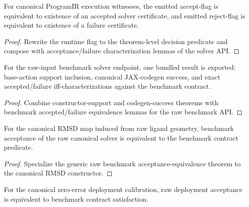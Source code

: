 \begin{theorem}\label{thm:canonical-program-execution-refines-solver-result}
For canonical ProgramIR execution witnesses, the emitted accept-flag is equivalent to existence of an accepted solver certificate, and emitted reject-flag is equivalent to existence of a failure certificate.
\end{theorem}

\begin{proof}
Rewrite the runtime flag to the theorem-level decision predicate and compose with acceptance/failure characterization lemmas of the solver API.
\end{proof}

\begin{theorem}\label{thm:raw-pocket-ligand-benchmark-solver-bundle}
For the raw-input benchmark solver endpoint, one bundled result is exported: base-action support inclusion, canonical JAX-codegen success, and exact accepted/failure iff-characterizations against the benchmark contract.
\end{theorem}

\begin{proof}
Combine constructor-support and codegen-success theorems with benchmark accepted/failure equivalence lemmas for the raw benchmark API.
\end{proof}

\begin{theorem}\label{thm:canonical-raw-benchmark-acceptance-equivalence}
For the canonical RMSD map induced from raw ligand geometry, benchmark acceptance of the raw canonical solver is equivalent to the benchmark contract predicate.
\end{theorem}

\begin{proof}
Specialize the generic raw benchmark acceptance-equivalence theorem to the canonical RMSD constructor.
\end{proof}

\begin{theorem}\label{thm:canonical-raw-deployment-acceptance-equivalence}
For the canonical zero-error deployment calibration, raw deployment acceptance is equivalent to benchmark contract satisfaction.
\end{theorem}

